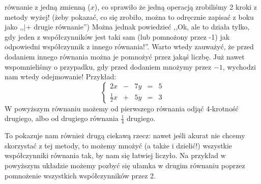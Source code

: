 \documentclass{article}
\theoremstyle{remark}
\begin{document}
równanie z jedną zmienną ($x$),
co sprawiło że jedną operacją zrobiliśmy 2 kroki z metody wyżej!
(żeby pokazać, co się zrobiło, można to odręcznie zapisać z boku jako ,,$| +$ drugie równanie'')
Można jednak powiedzieć ,,Ok, ale to działa tylko, gdy jeden z
współczynników jest taki sam (lub pomnożony przez -1) jak odpowiedni
współczynnik z innego równania!''.
Warto wtedy zauważyć, że przed dodaniem innego równania można je
pomnożyć przez jakąś liczbę. Już nawet wspomnieliśmy o przypadku, gdy przed dodaniem
mnożymy przez $-1$, wychodzi nam wtedy odejmowanie! Przykład:
\begin{displaymath}
  \left\{
    \begin{array}{lllll}
      2x &-& 7y &=& 5\\
      \tfrac12x &+& 5y &=& 3
    \end{array}
    \right.
\end{displaymath}
W powyższym równaniu możemy od pierwszego równania odjąć 4-krotność drugiego,
albo od drugiego równania $\tfrac14$ drugiego.

To pokazuje nam również drugą ciekawą rzecz: nawet jeśli akurat nie chcemy skorzystać z
tej metody, to możemy mnożyć (a także i dzielić!) wszystkie współczynniki równania tak,
by nam się łatwiej liczyło. Na przykład w powyższym układzie możemy pozbyć się ułamka
w drugim równaniu poprzez pomnożenie wszystkich współczynników przez 2.
\end{document}
